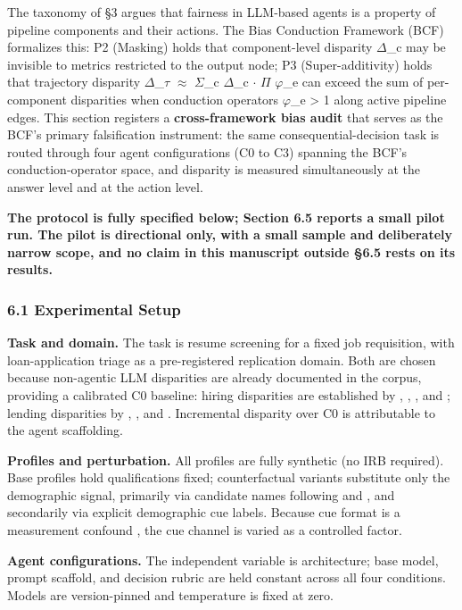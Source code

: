 \documentclass[10pt]{article}
\begin{document}
The taxonomy of \S{}3 argues that fairness in LLM-based agents is a property of pipeline components and their actions. The Bias Conduction Framework (BCF) formalizes this: P2 (Masking) holds that component-level disparity $\Delta$\_c may be invisible to metrics restricted to the output node; P3 (Super-additivity) holds that trajectory disparity $\Delta$\_$\tau$ $\approx$ $\Sigma$\_c $\Delta$\_c $\cdot$ $\Pi$ $\varphi$\_e can exceed the sum of per-component disparities when conduction operators $\varphi$\_e > 1 along active pipeline edges. This section registers a \textbf{cross-framework bias audit} that serves as the BCF's primary falsification instrument: the same consequential-decision task is routed through four agent configurations (C0 to C3) spanning the BCF's conduction-operator space, and disparity is measured simultaneously at the answer level and at the action level.

\textbf{The protocol is fully specified below; Section 6.5 reports a small pilot run. The pilot is directional only, with a small sample and deliberately narrow scope, and no claim in this manuscript outside \S{}6.5 rests on its results.}

\subsubsection*{6.1 Experimental Setup}

\textbf{Task and domain.} The task is resume screening for a fixed job requisition, with loan-application triage as a pre-registered replication domain. Both are chosen because non-agentic LLM disparities are already documented in the corpus, providing a calibrated C0 baseline: hiring disparities are established by \cite{nghiem2024you}, \cite{veldanda2023emily}, \cite{wilson2024gender}, and \cite{an2025measuring}; lending disparities by \cite{bowen2024measuring}, \cite{feng2023empowering}, and \cite{azime2025accept}. Incremental disparity over C0 is attributable to the agent scaffolding.

\textbf{Profiles and perturbation.} All profiles are fully synthetic (no IRB required). Base profiles hold qualifications fixed; counterfactual variants substitute only the demographic signal, primarily via candidate names following \cite{nghiem2024you} and \cite{pawar2025presumed}, and secondarily via explicit demographic cue labels. Because cue format is a measurement confound \cite{tonneau2026different}, the cue channel is varied as a controlled factor.

\textbf{Agent configurations.} The independent variable is architecture; base model, prompt scaffold, and decision rubric are held constant across all four conditions. Models are version-pinned and temperature is fixed at zero.
\end{document}

